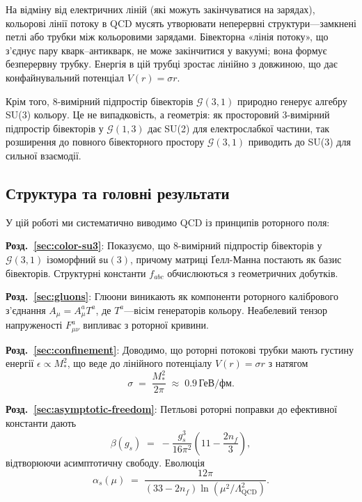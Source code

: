 \documentclass[11pt,a4paper]{article}
\newcommand{\Cl}{\mathcal{G}}
\theoremstyle{definition}
\theoremstyle{plain}
\theoremstyle{remark}
\begin{document}
На відміну від електричних ліній (які можуть закінчуватися на зарядах), кольорові лінії потоку в QCD мусять утворювати неперервні структури—замкнені петлі або трубки між кольоровими зарядами. Бівекторна «лінія потоку», що з’єднує пару кварк–антикварк, не може закінчитися у вакуумі; вона формує безперервну трубку. Енергія в цій трубці зростає лінійно з довжиною, що дає конфайнувальний потенціал $V(r)=\sigma r$.

Крім того, 8-вимірний підпростір бівекторів $\Cl(3,1)$ природно генерує алгебру SU(3) кольору. Це не випадковість, а геометрія: як просторовий 3-вимірний підпростір бівекторів у $\Cl(1,3)$ дає SU(2) для електрослабкої частини, так розширення до повного бівекторного простору $\Cl(3,1)$ приводить до SU(3) для сильної взаємодії.

\subsection{Структура та головні результати}

У цій роботі ми систематично виводимо QCD із принципів роторного поля:

\textbf{Розд.~\ref{sec:color-su3}}: Показуємо, що 8-вимірний підпростір бівекторів у $\Cl(3,1)$ ізоморфний $\mathfrak{su}(3)$, причому матриці Ґелл-Манна постають як базис бівекторів. Структурні константи $f_{abc}$ обчислюються з геометричних добутків.

\textbf{Розд.~\ref{sec:gluons}}: Глюони виникають як компоненти роторного калібрового з’єднання $A_\mu=A_\mu^aT^a$, де $T^a$—вісім генераторів кольору. Неабелевий тензор напруженості $F_{\mu\nu}^a$ випливає з роторної кривини.

\textbf{Розд.~\ref{sec:confinement}}: Доводимо, що роторні потокові трубки мають густину енергії $\epsilon\propto M_\ast^2$, що веде до лінійного потенціалу $V(r)=\sigma r$ з натягом
\begin{equation}
\sigma \;=\; \frac{M_\ast^2}{2\pi} \;\approx\; 0{.}9\,\text{ГеВ/фм}.
\end{equation}

\textbf{Розд.~\ref{sec:asymptotic-freedom}}: Петльові роторні поправки до ефективної константи дають
\begin{equation}
\beta(g_s) \;=\; -\frac{g_s^3}{16\pi^2}\left(11 - \frac{2n_f}{3}\right),
\end{equation}
відтворюючи асимптотичну свободу. Еволюція
\begin{equation}
\alpha_s(\mu) \;=\; \frac{12\pi}{(33 - 2n_f)\ln(\mu^2/\Lambda_{\mathrm{QCD}}^2)}.
\end{equation}
\end{document}
